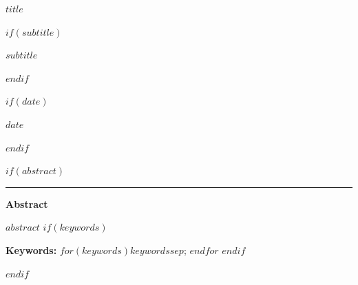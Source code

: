 \documentclass[12pt]{article}
\newif\ifdocdesigneranon
\begin{document}
\begin{titlepage}
\thispagestyle{empty}
\vspace*{0.12\textheight}
\begin{center}
\begin{singlespace}

{\LARGE\bfseries $title$\par}

$if(subtitle)$
\vspace{0.35em}
{\large $subtitle$\par}
$endif$

\vspace{2.2em}

\docdesignerauthorblock

\par\vspace{1.5\baselineskip}
\docdesignerseriesblock

$if(date)$
\ifdocdesigneranon\else
\vspace{0.35em}
{\small $date$}\par
\fi
$endif$

$if(abstract)$
\vspace{2.2\baselineskip}
\noindent\rule{0.35\textwidth}{0.4pt}\par
\vspace{0.65em}
\begin{minipage}{0.78\textwidth}
\small\singlespacing
\textbf{Abstract}\par\vspace{0.3em}
$abstract$
$if(keywords)$
\par\vspace{0.6em}
\textbf{Keywords:} $for(keywords)$$keywords$$sep$; $endfor$
$endif$
\end{minipage}
$endif$

\end{singlespace}
\end{center}
\vfill
\end{titlepage}
\else
\end{document}
